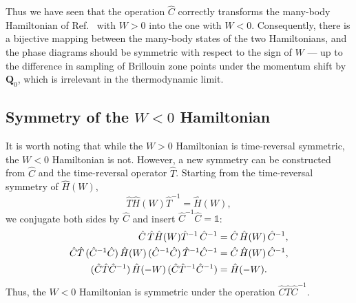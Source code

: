 Thus we have seen that the operation $\hat{C}$ correctly transforms the many-body Hamiltonian of Ref.~\cite{kwan2025textured} with $W>0$ into the one with $W<0$. Consequently, there is a bijective mapping between the many-body states of the two Hamiltonians, and the phase diagrams should be symmetric with respect to the sign of $W$ — up to the difference in sampling of Brillouin zone points under the momentum shift by $\mathbf{Q}_0$, which is irrelevant in the thermodynamic limit.

\subsection{Symmetry of the \texorpdfstring{$W<0$}{W < 0} Hamiltonian}
It is worth noting that while the $W>0$ Hamiltonian is time-reversal symmetric, the $W<0$ Hamiltonian is not. However, a new symmetry can be constructed from $\hat{C}$ and the time-reversal operator $\hat{T}$. Starting from the time-reversal symmetry of $\hat{H}(W)$,
\begin{equation}
    \hat{T} \hat{H}(W) \hat{T}^{-1} = \hat{H}(W),
\end{equation}
we conjugate both sides by $\hat{C}$ and insert $\hat{C}^{-1}\hat{C} = \mathds{1}$:
\begin{align}
    \hat{C}\, \hat{T} \hat{H}(W) \hat{T}^{-1}\, \hat{C}^{-1} &= \hat{C}\, \hat{H}(W)\, \hat{C}^{-1}, \notag \\
    \hat{C} \hat{T}\, (\hat{C}^{-1} \hat{C})\, \hat{H}(W)\, (\hat{C}^{-1} \hat{C})\, \hat{T}^{-1} \hat{C}^{-1} &= \hat{C}\, \hat{H}(W)\, \hat{C}^{-1}, \notag \\
    (\hat{C} \hat{T} \hat{C}^{-1})\, \hat{H}(-W)\, (\hat{C} \hat{T}^{-1} \hat{C}^{-1}) &= \hat{H}(-W).
\end{align}
Thus, the $W<0$ Hamiltonian is symmetric under the operation $\hat{C}\hat{T}\hat{C}^{-1}$.